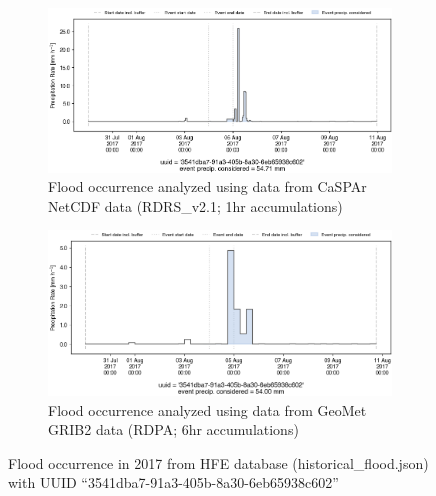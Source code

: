 \documentclass[10pt,a4paper,titlepage,parskip]{scrartcl}
\begin{document}
\begin{figure}[h]
	\begin{subfigure}[a]{1.0\textwidth}
		\centering
		\includegraphics[width=\linewidth]{figures/compare_Geomet_CaSPAr/interpolated_at_stations_occurrence_1303_identified-timesteps_RDRS_v2.1.png}
		\caption{Flood occurrence analyzed using data from CaSPAr NetCDF data (RDRS\_v2.1; 1hr accumulations)}
	\end{subfigure}
	\par\bigskip\bigskip
	\begin{subfigure}[b]{1.0\textwidth}
		\centering
		\includegraphics[width=\linewidth]{figures/compare_Geomet_CaSPAr/interpolated_at_stations_occurrence_1303_identified-timesteps_rdpa:10km:6f.png}
		\caption{Flood occurrence analyzed using data from GeoMet GRIB2 data (RDPA; 6hr accumulations)}
	\end{subfigure}
	\par\bigskip\bigskip
	\caption{Flood occurrence in 2017 from HFE database (historical\_flood.json) with UUID ``3541dba7-91a3-405b-8a30-6eb65938c602''}
\end{figure}
\pagebreak
\end{document}
